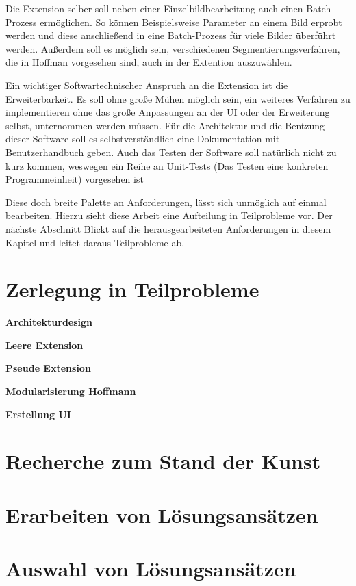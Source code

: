 Die Extension selber soll neben einer Einzelbildbearbeitung auch einen Batch-Prozess
ermöglichen. So können Beispielsweise Parameter an einem Bild erprobt werden und
diese anschließend in eine Batch-Prozess für viele Bilder überführt werden.
Außerdem soll es möglich sein, verschiedenen Segmentierungsverfahren, die in
Hoffman vorgesehen sind, auch in der Extention auszuwählen.

Ein wichtiger Softwartechnischer Anspruch an die Extension ist die Erweiterbarkeit.
Es soll ohne große Mühen möglich sein, ein weiteres Verfahren zu implementieren ohne
das große Anpassungen an der UI oder der Erweiterung selbst, unternommen werden
müssen. Für die Architektur und die Bentzung dieser Software soll es selbstverständlich
eine Dokumentation mit Benutzerhandbuch geben. Auch das Testen der Software soll
natürlich nicht zu kurz kommen, weswegen ein Reihe an Unit-Tests (Das Testen
eine konkreten Programmeinheit) vorgesehen ist

Diese doch breite Palette an Anforderungen, lässt sich unmöglich auf einmal
bearbeiten. Hierzu sieht diese Arbeit eine Aufteilung in Teilprobleme vor. Der
nächste Abschnitt Blickt auf die herausgearbeiteten Anforderungen in diesem
Kapitel und leitet daraus Teilprobleme ab.

\section{Zerlegung in Teilprobleme}

\textbf{Architekturdesign}

\textbf{Leere Extension}

\textbf{Pseude Extension}

\textbf{Modularisierung Hoffmann}

\textbf{Erstellung UI}

\section{Recherche zum Stand der Kunst}

\section{Erarbeiten von Lösungsansätzen}

\section{Auswahl von Lösungsansätzen}